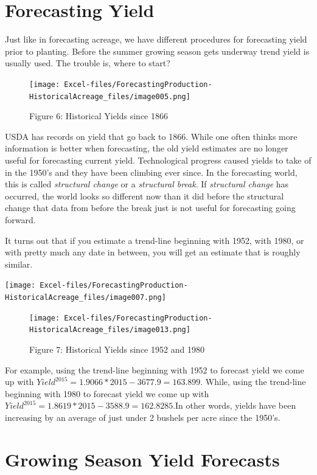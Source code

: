\documentclass[
]{book}
\begin{document}
\hypertarget{forecasting-yield}{%
\section{Forecasting Yield}\label{forecasting-yield}}

Just like in forecasting acreage, we have different procedures for forecasting yield prior to planting. Before the summer growing season gets underway trend yield is usually used. The trouble is, where to start?

\begin{figure}
\centering
\texttt{[image: Excel-files/ForecastingProduction-HistoricalAcreage\_files/image005.png]}
\caption{Figure 6: Historical Yields since 1866}
\end{figure}

USDA has records on yield that go back to 1866. While one often thinks more information is better when forecasting, the old yield estimates are no longer useful for forecasting current yield. Technological progress caused yields to take of in the 1950's and they have been climbing ever since. In the forecasting world, this is called \emph{structural change} or a \emph{structural break}. If \emph{structural change} has occurred, the world looks so different now than it did before the structural change that data from before the break just is not useful for forecasting going forward.

It turns out that if you estimate a trend-line beginning with 1952, with 1980, or with pretty much any date in between, you will get an estimate that is roughly similar.

\texttt{[image: Excel-files/ForecastingProduction-HistoricalAcreage\_files/image007.png]}

\begin{figure}
\centering
\texttt{[image: Excel-files/ForecastingProduction-HistoricalAcreage\_files/image013.png]}
\caption{Figure 7: Historical Yields since 1952 and 1980}
\end{figure}

For example, using the trend-line beginning with 1952 to forecast yield we come up with \(Yield^{2015} = 1.9066*2015 - 3677.9 = 163.899\). While, using the trend-line beginning with 1980 to forecast yield we come up with \(Yield^{2015} = 1.8619*2015 - 3588.9 = 162.8285\).In other words, yields have been increasing by an average of just under 2 bushels per acre since the 1950's.

\hypertarget{growing-season-yield-forecasts}{%
\section{Growing Season Yield Forecasts}\label{growing-season-yield-forecasts}}
\end{document}
